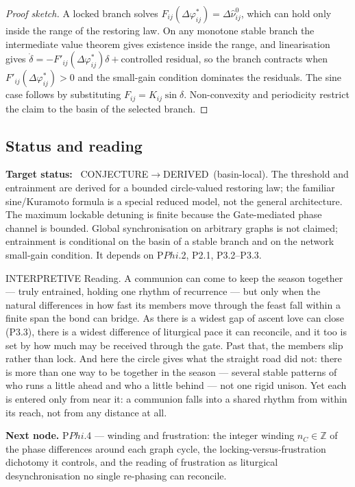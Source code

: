 \documentclass[11pt,a4paper]{article}
\def\Phi{Phi}%
\def\emph#1{#1}%
\newcommand{\stDerived}{\textcolor{cDer}{\textsf{\small DERIVED}}}
\newcommand{\stInterp}{\textcolor{cInt}{\textsf{\small INTERPRETIVE}}}
\newcommand{\stConj}{\textcolor{cCon}{\textsf{\small CONJECTURE}}}
\theoremstyle{definition}
\theoremstyle{plain}
\theoremstyle{remark}
\begin{document}
\begin{proof}[Proof sketch]
A locked branch solves \(F_{ij}(\Delta\varphi_{ij}^{*})=\Delta\hat\nu_{ij}^{0}\), which can
hold only inside the range of the restoring law. On any monotone stable branch the intermediate
value theorem gives existence inside the range, and linearisation gives
\(\dot\delta=-F'_{ij}(\Delta\varphi_{ij}^{*})\delta+\text{controlled residual}\), so the
branch contracts when \(F'_{ij}(\Delta\varphi_{ij}^{*})>0\) and the small-gain condition
dominates the residuals. The sine case follows by substituting \(F_{ij}=K_{ij}\sin\delta\).
Non-convexity and periodicity restrict the claim to the basin of the selected branch.
\qedhere
\end{proof}

\subsection{Status and reading}

\textbf{Target status:}~
\stConj\(\to\)\stDerived\ (basin-local). The threshold and entrainment are derived for a
bounded circle-valued restoring law; the familiar sine/Kuramoto formula is a special reduced
model, not the general architecture. The maximum lockable detuning is finite because the
Gate-mediated phase channel is bounded. Global synchronisation on arbitrary graphs is not
claimed; entrainment is conditional on the basin of a stable branch and on the network
small-gain condition. It depends on P$\Phi$.2, P2.1, P3.2--P3.3.

\medskip
\stInterp\quad
\emph{Reading.}
A communion can come to keep the season together --- truly entrained, holding one rhythm of
recurrence --- but only when the natural differences in how fast its members move through the
feast fall within a finite span the bond can bridge. As there is a widest gap of ascent love
can close (P3.3), there is a widest difference of liturgical pace it can reconcile, and it too
is set by how much may be received through the gate. Past that, the members slip rather than
lock. And here the circle gives what the straight road did not: there is more than one way to
be together in the season --- several stable patterns of who runs a little ahead and who a
little behind --- not one rigid unison. Yet each is entered only from near it: a communion
falls into a shared rhythm from within its reach, not from any distance at all.

\medskip
\textbf{Next node.} P$\Phi$.4 --- winding and frustration: the integer winding
\(n_C\in\mathbb Z\) of the phase differences around each graph cycle, the
locking-versus-frustration dichotomy it controls, and the reading of frustration as
liturgical desynchronisation no single re-phasing can reconcile.
\end{document}
